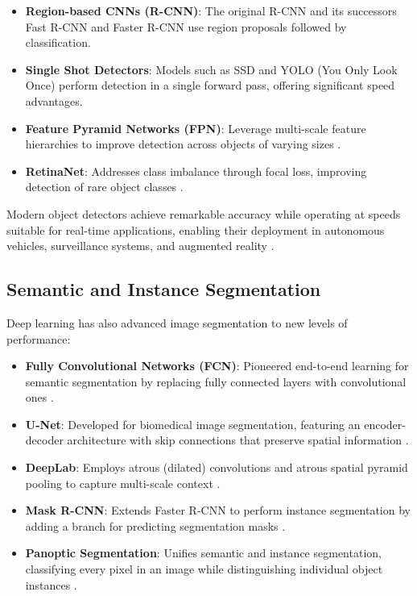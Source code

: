 \begin{itemize}
    \item \textbf{Region-based CNNs (R-CNN)}: The original R-CNN \cite{girshick2014rich} and its successors Fast R-CNN \cite{girshick2015fast} and Faster R-CNN \cite{ren2015faster} use region proposals followed by classification.
    
    \item \textbf{Single Shot Detectors}: Models such as SSD \cite{liu2016ssd} and YOLO (You Only Look Once) \cite{redmon2016you} perform detection in a single forward pass, offering significant speed advantages.
    
    \item \textbf{Feature Pyramid Networks (FPN)}: Leverage multi-scale feature hierarchies to improve detection across objects of varying sizes \cite{lin2017feature}.
    
    \item \textbf{RetinaNet}: Addresses class imbalance through focal loss, improving detection of rare object classes \cite{lin2017focal}.
\end{itemize}

Modern object detectors achieve remarkable accuracy while operating at speeds suitable for real-time applications, enabling their deployment in autonomous vehicles, surveillance systems, and augmented reality \cite{zou2019object}.

\subsection{Semantic and Instance Segmentation}
Deep learning has also advanced image segmentation to new levels of performance:

\begin{itemize}
    \item \textbf{Fully Convolutional Networks (FCN)}: Pioneered end-to-end learning for semantic segmentation by replacing fully connected layers with convolutional ones \cite{long2015fully}.
    
    \item \textbf{U-Net}: Developed for biomedical image segmentation, featuring an encoder-decoder architecture with skip connections that preserve spatial information \cite{ronneberger2015u}.
    
    \item \textbf{DeepLab}: Employs atrous (dilated) convolutions and atrous spatial pyramid pooling to capture multi-scale context \cite{chen2017deeplab}.
    
    \item \textbf{Mask R-CNN}: Extends Faster R-CNN to perform instance segmentation by adding a branch for predicting segmentation masks \cite{he2017mask}.
    
    \item \textbf{Panoptic Segmentation}: Unifies semantic and instance segmentation, classifying every pixel in an image while distinguishing individual object instances \cite{kirillov2019panoptic}.
\end{itemize}

